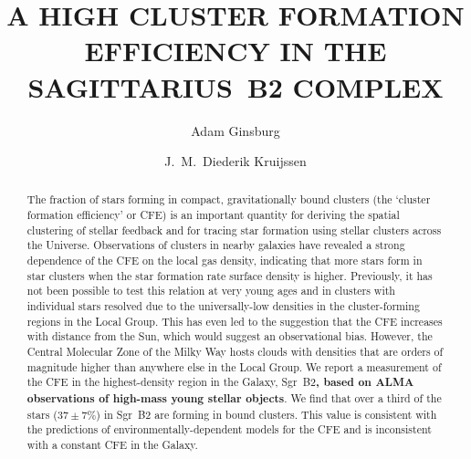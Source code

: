 \documentclass[twocolumn]{aastex62}
\def\referee#1{\textbf{#1}}
\begin{document}
\title{A HIGH CLUSTER FORMATION EFFICIENCY IN THE SAGITTARIUS~B2 COMPLEX}


\author[0000-0001-6431-9633]{Adam Ginsburg}

\author[0000-0002-8804-0212]{J.~M.\ Diederik Kruijssen}



\begin{abstract}
    The fraction of stars forming in compact, gravitationally bound clusters
    (the `cluster formation efficiency' or CFE) is an important quantity for
    deriving the spatial clustering of stellar feedback and for tracing star
    formation using stellar clusters across the Universe.  Observations of
    clusters in nearby galaxies have revealed a strong dependence of the CFE on
    the local gas density, indicating that more stars form in star clusters
    when the star formation rate surface density is higher. Previously, it has
    not been possible to test this relation at very young ages and in clusters
    with individual stars resolved due to the universally-low densities in the
    cluster-forming regions in the Local Group. This has even led to the
    suggestion that the CFE increases with distance from the Sun, which would
    suggest an observational bias.  However, the Central Molecular Zone of the
    Milky Way hosts clouds with densities that are orders of magnitude higher
    than anywhere else in the Local Group.  We report a measurement of the CFE
    in the highest-density region in the Galaxy, Sgr~B2\referee{, based on ALMA
    observations of high-mass young stellar objects}.  We find that over a
    third of the stars ($37\pm7\%$)  in Sgr~B2 are forming in bound clusters.
    This value is consistent with the predictions of environmentally-dependent
    models for the CFE and is inconsistent with a constant CFE in the
    Galaxy.
    \vspace{10mm}
\end{abstract}
\end{document}
